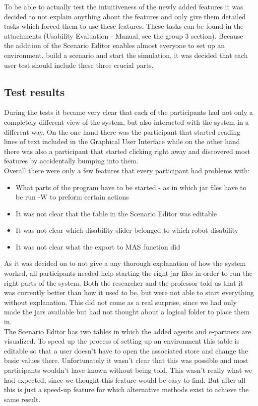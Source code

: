 To be able to actually test the intuitiveness of the newly added features it was decided to not explain anything about the features and only give them detailed tasks which forced them to use these features. These tasks can be found in the attachments (Usability Evaluation - Manual, see the group 3 section). Because the addition of the Scenario Editor enables almost everyone to set up an environment, build a scenario and start the simulation, it was decided that each user test should include these three crucial parts.

\subsection*{Test results}
During the tests it became very clear that each of the participants had not only a completely different view of the system, but also interacted with the system in a different way. On the one hand there was the participant that started reading lines of text included in the Graphical User Interface while on the other hand there was also a participant that started clicking right away and discovered most features by accidentally bumping into them. \\
Overall there were only a few features that every participant had problems with:
\begin{itemize}
\item What parts of the program have to be started - as in which jar files have to be run -W to preform certain actions
\item It was not clear that the table in the Scenario Editor was editable
\item It was not clear which disability slider belonged to which robot disability
\item It was not clear what the export to MAS function did
\end{itemize}
As it was decided on to not give a any thorough explanation of how the system worked, all participants needed help starting the right jar files in order to run the right parts of the system. Both the researcher and the professor told us that it was currently better than how it used to be, but were not able to start everything without explanation. This did not come as a real surprise, since we had only made the jars available but had not thought about a logical folder to place them in.\\
The Scenario Editor has two tables in which the added agents and e-partners are visualized. To speed up the process of setting up an environment this table is editable so that a user doesn't have to open the associated store and change the basic values there. Unfortunately it wasn't clear that this was possible and most participants wouldn't have known without being told. This wasn't really what we had expected, since we thought this feature would be easy to find. But after all this is just a speed-up feature for which alternative methods exist to achieve the same result.\\
